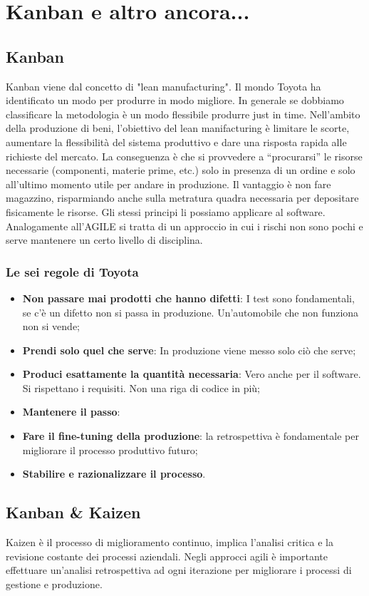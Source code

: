 \section{Kanban e altro ancora...}
\subsection{Kanban}
Kanban viene dal concetto di "lean manufacturing". Il mondo Toyota ha identificato un modo per produrre in modo migliore. In generale se dobbiamo classificare la metodologia è un modo flessibile produrre just in time. Nell’ambito della produzione di beni, l’obiettivo del lean manifacturing è limitare le scorte, aumentare la flessibilità del sistema produttivo e dare una risposta rapida alle richieste del mercato. La conseguenza è che si provvedere a “procurarsi” le risorse necessarie (componenti, materie prime, etc.) solo in presenza di un ordine e solo all’ultimo momento utile per andare in produzione.
Il vantaggio è non fare magazzino, risparmiando anche sulla metratura quadra necessaria per depositare fisicamente le risorse. Gli stessi principi li possiamo applicare al software.
Analogamente all'AGILE si tratta di un approccio in cui i rischi non sono pochi e serve mantenere un certo livello di disciplina.

\subsubsection{Le sei regole di Toyota}
\begin{itemize}
	\item \textbf{Non passare mai prodotti che hanno difetti}: I test sono fondamentali, se c'è un difetto non si passa in produzione. Un'automobile che non funziona non si vende;
	\item \textbf{Prendi solo quel che serve}: In produzione viene messo solo ciò che serve;
	\item \textbf{Produci esattamente la quantità necessaria}: Vero anche per il software. Si rispettano i requisiti. Non una riga di codice in più;
	\item \textbf{Mantenere il passo}:
	\item \textbf{Fare il fine-tuning della produzione}: la retrospettiva è fondamentale per migliorare il processo produttivo futuro;
	\item \textbf{Stabilire e razionalizzare il processo}.
\end{itemize}
\subsection{Kanban \& Kaizen}
Kaizen è il processo di miglioramento continuo, implica l’analisi critica e la revisione
costante dei processi aziendali. Negli approcci agili è importante effettuare un’analisi retrospettiva ad
ogni iterazione per migliorare i processi di gestione e produzione.
